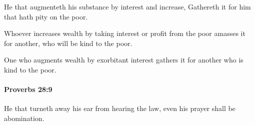 			\begin{versebox}
					\item[BHS] 
					\item[ASV] He that augmenteth his substance by interest and increase, Gathereth it for him that hath pity on the poor.
					\item[NIV] Whoever increases wealth by taking interest or profit from the poor amasses it for another, who will be kind to the poor.
					\item[NRSV] One who augments wealth by exorbitant interest gathers it for another who is kind to the poor.
			\end{versebox}

		\paragraph{Proverbs 28:9} %
			\label{PROVERBS-28-9}

			He that turneth away his ear from hearing the law, even his prayer shall be abomination.

